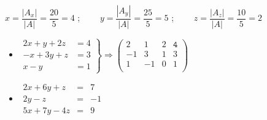 \documentclass[12pt, twocolumn, landscape, a4paper]{article}
\begin{document}
$x = \dfrac{|A_{x}|}{|A|} = \dfrac{20}{5} = 4$ ; $\quad\quad y = \dfrac{|A_{y}|}{|A|} = \dfrac{25}{5} = 5$ ; $\quad\quad z = \dfrac{|A_{z}|}{|A|} = \dfrac{10}{5} = 2$


\begin{itemize}
\item{%
$\left .
\begin{array}{cc}
2x + y + 2z & = 4 \\
-x + 3y + z & = 3 \\ 
x - y &= 1
\end{array} \right \} \Rightarrow \left (
\begin{array}{ccc|r}
2 & 1 & 2 & \mathtt{4} \\
-1 & 3 & 1 & 3 \\ 
1 & -1 & 0 & 1 \\
\end{array} \right )
$
}
\end{itemize}

\begin{itemize}
\item{$
\begin{array}{ccr}
2x + 6y + z & = & 7 \\
2y - z & = & -1 \\
5x + 7y - 4z & = & 9
\end{array}
$}
\end{itemize}
\end{document}
